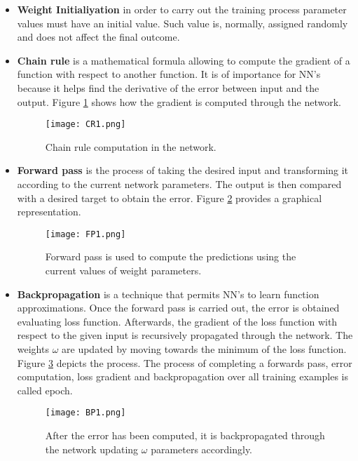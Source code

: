 \begin{itemize}
\item \textbf{Weight Initialiyation} in order to carry out the training process parameter values must have an initial value. Such value is, normally, assigned  randomly and does not affect the final outcome.

\item \textbf{Chain rule} is a mathematical formula allowing to compute the gradient of a function with respect to another function. It is of importance for NN's because it helps find the derivative of the error between input and the output. Figure \ref{fig:CRim1} shows how the  gradient is computed through the network.

\begin{figure}[tb] 
\centering 
\texttt{[image: CR1.png]} 
\caption[Chain rule in neural networks]{Chain rule computation in the network.}
\label{fig:CRim1} 
\end{figure}

\item \textbf{Forward pass} is the process of taking the desired input and transforming it according to the current network parameters. The output is then compared with a desired target to obtain the error. Figure \ref{fig:FPim1} provides a graphical representation. 

\begin{figure}[tb] 
\centering 
\texttt{[image: FP1.png]} 
\caption[Forward pass to compute error]{Forward pass is used to compute the predictions using the current values of weight parameters.}
\label{fig:FPim1} 
\end{figure}

\item \textbf{Backpropagation} is a technique that permits NN's to learn function approximations. Once the forward pass is carried out, the error is obtained evaluating loss function. Afterwards,  the gradient of the loss function with respect to the given input is recursively propagated through the network. The weights $\omega$ are updated by moving towards the minimum of the loss function. Figure \ref{fig:BPim1} depicts the process. The process of completing a forwards pass, error computation, loss gradient and backpropagation over all training examples is called epoch. 

\begin{figure}[tb] 
\centering 
\texttt{[image: BP1.png]} 
\caption[Backpropagation process through the network]{After the error has been computed, it is backpropagated through the network updating $\omega$ parameters accordingly.}
\label{fig:BPim1} 
\end{figure} 	


\end{itemize}
